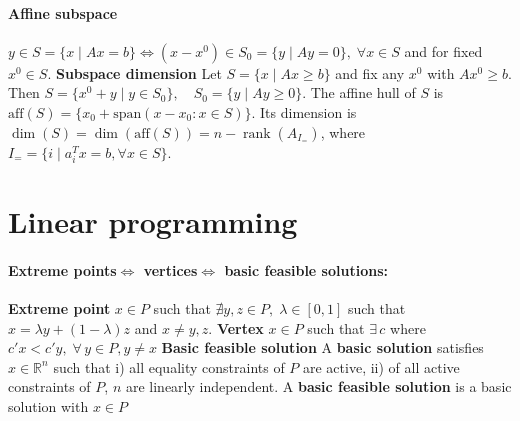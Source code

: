 \documentclass{article}
\begin{document}

\paragraph{Affine subspace} $y \in S = \{x \mid Ax=b\} \iff (x - x^0) \in S_0 = \{y \mid Ay = 0\},\; \forall x\in S$ and for fixed $x^0\in S$. 
\textbf{Subspace dimension} Let $S = \{x \mid A x \geq b\}$ and fix any $x^0$ with $A x^0 \geq b$. Then $S = \{x^0 + y \mid y \in S_0\}, \quad S_0 = \{y \mid A y \geq 0\}$.
The affine hull of $S$ is $\text{aff}(S) = \{x_0 + \text{span}(x - x_0 : x \in S)\}$. Its dimension is $\dim(S) = \dim(\text{aff}(S)) = n - \operatorname{rank}(A_{I_=})$, where $I_= = \{i\mid a_i^Tx = b, \forall x\in S\}$.


\section{Linear programming}
\paragraph{Extreme points$\iff$ vertices$\iff$ basic feasible solutions:}
\textbf{Extreme point} $x\in P$ such that $\nexists y,z\in P, \; \lambda \in [0,1]$ such that $x = \lambda y + (1 - \lambda)z$ and $x \neq y,z$.
\textbf{Vertex} $x\in P$ such that $\exists\,c$ where $c'x < c'y, \; \forall\, y\in P, y\neq x$
\textbf{Basic feasible solution} A \textbf{basic solution} satisfies $x \in \mathbb R^n$ such that i) all equality constraints of $P$ are active, ii) of all active constraints of $P$, $n$ are linearly independent. A \textbf{basic feasible solution} is a basic solution with $x \in P$ 
\end{document}
